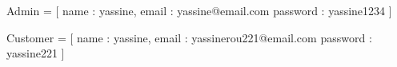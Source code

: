 Admin = [
    {
        name : yassine,
        email : yassine@email.com
        password : yassine1234
    }
]

Customer = [
    {
        name : yassine,
        email : yassinerou221@email.com
        password : yassine221
    }
]
